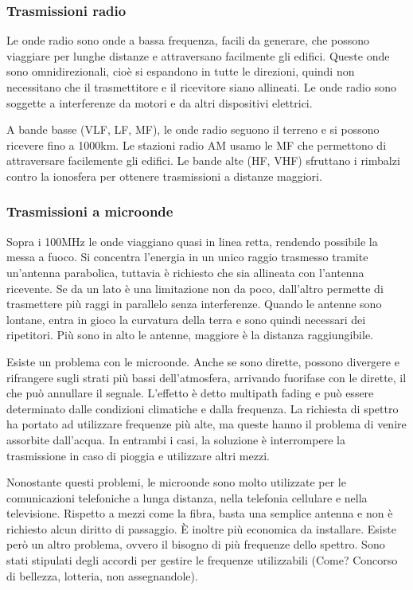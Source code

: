 \subsubsection{Trasmissioni radio}
Le onde radio sono onde a bassa frequenza, facili da generare, che possono viaggiare per lunghe distanze e attraversano facilmente gli edifici. 
Queste onde sono omnidirezionali, cioè si espandono in tutte le direzioni, quindi non necessitano che il trasmettitore e il ricevitore siano allineati.
Le onde radio sono soggette a interferenze da motori e da altri dispositivi elettrici.

A bande basse (VLF, LF, MF), le onde radio seguono il terreno e si possono ricevere fino a 1000km.
Le stazioni radio AM usamo le MF che permettono di attraversare facilemente gli edifici.
Le bande alte (HF, VHF) sfruttano i rimbalzi contro la ionosfera per ottenere trasmissioni a distanze maggiori.

\subsubsection{Trasmissioni a microonde}
Sopra i 100MHz le onde viaggiano quasi in linea retta, rendendo possibile la messa a fuoco.
Si concentra l'energia in un unico raggio trasmesso tramite un'antenna parabolica, tuttavia è richiesto che sia allineata con l'antenna ricevente.
Se da un lato è una limitazione non da poco, dall'altro permette di trasmettere più raggi in parallelo senza interferenze.
Quando le antenne sono lontane, entra in gioco la curvatura della terra e sono quindi necessari dei ripetitori.
Più sono in alto le antenne, maggiore è la distanza raggiungibile.

Esiste un problema con le microonde. Anche se sono dirette, possono divergere e rifrangere sugli strati più bassi dell'atmosfera,
arrivando fuorifase con le dirette, il che può annullare il segnale.
L'effetto è detto multipath fading e può essere determinato dalle condizioni climatiche e dalla frequenza.
La richiesta di spettro ha portato ad utilizzare frequenze più alte, ma queste hanno il problema di venire assorbite dall'acqua. 
In entrambi i casi, la soluzione è interrompere la trasmissione in caso di pioggia e utilizzare altri mezzi.

Nonostante questi problemi, le microonde sono molto utilizzate per le comunicazioni telefoniche a lunga distanza, nella telefonia cellulare e nella televisione.
Rispetto a mezzi come la fibra, basta una semplice antenna e non è richiesto alcun diritto di passaggio. 
\`E inoltre più economica da installare.
Esiste però un altro problema, ovvero il bisogno di più frequenze dello spettro.
Sono stati stipulati degli accordi per gestire le frequenze utilizzabili (Come? Concorso di bellezza, lotteria, non assegnandole). 

